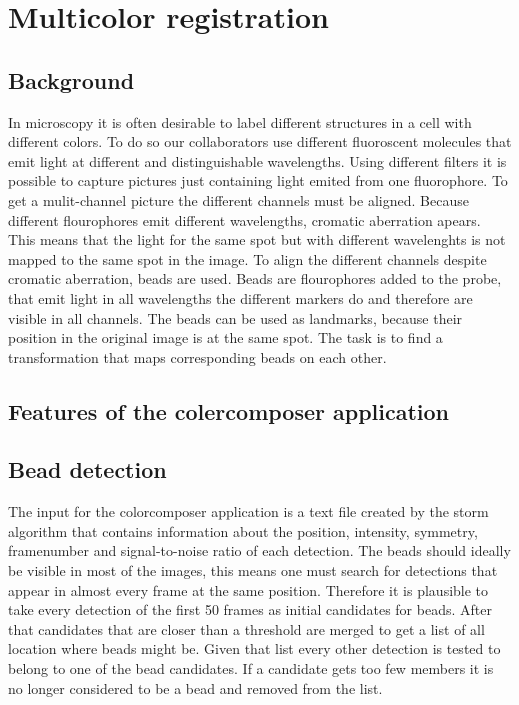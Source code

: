 \chapter{Multicolor registration}
\section{Background}
In microscopy it is often desirable to label different structures in a cell with
different colors. To do so our collaborators use different fluoroscent molecules
that emit light at different and distinguishable wavelengths. Using different
filters it is possible to capture pictures just containing light emited from one
fluorophore. To get a mulit-channel picture the different channels must be
aligned. Because different flourophores emit different wavelengths, cromatic
aberration apears. This means that the light for the same spot but with
different wavelenghts is not mapped to the same spot in the image. To align the
different channels despite cromatic aberration, beads are used. Beads are
flourophores added to the probe, that emit light in all wavelengths the
different markers do and therefore are visible in all channels. The beads can be
used as landmarks, because their position in the original image is at the same
spot. The task is to find a transformation that maps corresponding beads on each
other.
\section{Features of the colercomposer application}

\section{Bead detection}
The input for the colorcomposer application is a text file created by the storm
algorithm that contains information about the position, intensity, symmetry,
framenumber and signal-to-noise ratio of each detection. The beads should
ideally be visible in most of the images, this means one must search for
detections that appear in almost every frame at the same position. Therefore it
is plausible to take every detection of the first 50 frames as initial
candidates for beads. After that candidates that are closer than a threshold are
merged to get a list of all location where beads might be. Given that list every
other detection is tested to belong to one of the bead candidates. If a
candidate gets too few members it is no longer considered to be a bead and
removed from the list.
